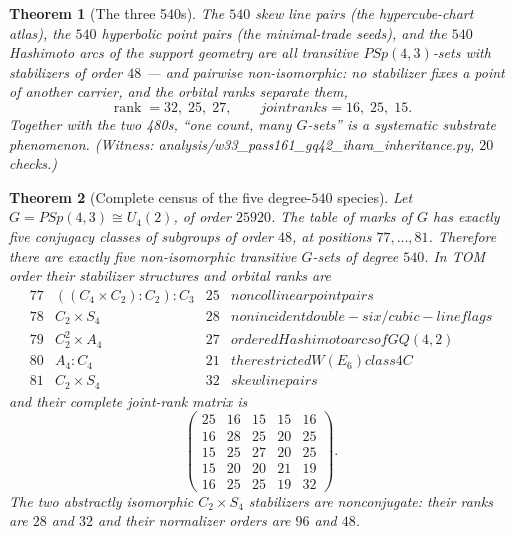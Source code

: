\documentclass[12pt,a4paper]{article}
\def\mathrm#1{#1}%
\def\texttt#1{#1}%
\def\text#1{#1}%
\newtheorem{theorem}{Theorem}[section]
\theoremstyle{definition}
\newcommand{\GQ}{\mathrm{GQ}}
\newcommand{\PSp}{\mathrm{PSp}}
\begin{document}
\begin{theorem}[The three 540s]
\label{thm:three-540s}
The $540$ skew line pairs (the hypercube-chart atlas), %
the $540$ hyperbolic point pairs (the minimal-trade seeds), %
and the $540$ Hashimoto arcs of the %
support geometry are all transitive $\PSp(4,3)$-sets with stabilizers of
order $48$ --- and pairwise \emph{non-isomorphic}: no stabilizer fixes a
point of another carrier, and the orbital ranks separate them,
\[
  \operatorname{rank}=32,\;25,\;27,
  \qquad
  \text{joint ranks}=16,\;25,\;15 .
\]
Together with the two 480s, ``one count, many $G$-sets'' is a systematic
substrate phenomenon. (Witness:
\texttt{analysis/w33\_pass161\_gq42\_ihara\_inheritance.py}, $20$ checks.)
\end{theorem}

\begin{theorem}[Complete census of the five degree-$540$ species] %
\label{thm:five-540s}
Let $G=\PSp(4,3)\cong U_4(2)$, of order $25920$.  The table of marks of
$G$ has exactly five conjugacy classes of subgroups of order $48$, at
positions $77,\ldots,81$.  Therefore there are exactly five
non-isomorphic transitive $G$-sets of degree $540$. %
In TOM order their
stabilizer structures and orbital ranks are
\[
\begin{array}{c|c|c|l}
77&((C_4\times C_2):C_2):C_3&25&
  \text{noncollinear point pairs}\\
78&C_2\times S_4&28&
  \text{nonincident double-six/cubic-line flags}\\
79&C_2^2\times A_4&27&
  \text{ordered Hashimoto arcs of }\GQ(4,2)\\
80&A_4:C_4&21&
  \text{the restricted }W(E_6)\text{ class }4C\\
81&C_2\times S_4&32&
  \text{skew line pairs}
\end{array}
\]
and their complete joint-rank matrix is
\[
\boxed{
\begin{pmatrix}
25&16&15&15&16\\
16&28&25&20&25\\
15&25&27&20&25\\
15&20&20&21&19\\
16&25&25&19&32
\end{pmatrix}}.
\]
The two abstractly isomorphic $C_2\times S_4$ stabilizers are
nonconjugate: their ranks are $28$ and $32$ and their normalizer orders
are $96$ and $48$.
\end{theorem}
\end{document}
